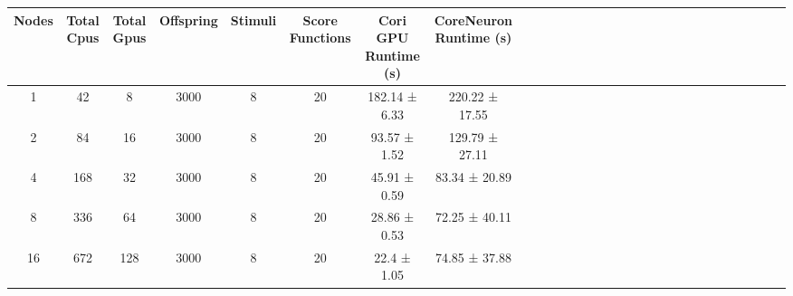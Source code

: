 \begin{tabular}{|c|c|c|c|c|c|c|c|c|c|c|c|c|c|c|c|c|c|c|c|c|c|c|c|c|c|c|c|c|}
\toprule
 Nodes &  Total Cpus &  Total Gpus &  Offspring &  Stimuli &  Score Functions & Cori GPU Runtime (s) & CoreNeuron Runtime (s) \\
\midrule
     1 &          42 &           8 &       3000 &        8 &               20 &        182.14 ± 6.33 &         220.22 ± 17.55 \\
     2 &          84 &          16 &       3000 &        8 &               20 &         93.57 ± 1.52 &         129.79 ± 27.11 \\
     4 &         168 &          32 &       3000 &        8 &               20 &         45.91 ± 0.59 &          83.34 ± 20.89 \\
     8 &         336 &          64 &       3000 &        8 &               20 &         28.86 ± 0.53 &          72.25 ± 40.11 \\
    16 &         672 &         128 &       3000 &        8 &               20 &          22.4 ± 1.05 &          74.85 ± 37.88 \\
\bottomrule
\end{tabular}
